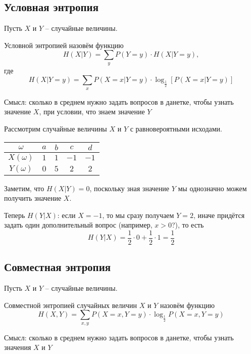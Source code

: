 \documentclass{article}
\begin{document}
\subsection{Условная энтропия}

Пусть $X$ и $Y$ -- случайные величины.

\begin{definition}
    Условной энтропией назовём функцию
    \[
        H(X|Y) = \sum_y P(Y = y) \cdot H(X|Y = y),  
    \]
    где
    \[
        H(X|Y = y) = \sum_x P(X = x | Y = y) \cdot \log_{\frac 12} \left[ P(X = x|Y = y) \right]
    \]

    \footnotesize{
        Смысл: сколько в среднем нужно задать вопросов в данетке, чтобы узнать значение $X$, при условии, что знаем значение $Y$
    }
\end{definition}

\begin{example}
    Рассмотрим случайные величины $X$ и $Y$ с равновероятными исходами.

    \begin{center}
        \begin{tabular}{|c|c|c|c|c|}
            \hline
            $\omega$    & $a$ & $b$ & $c$  & $d$  \\ \hline
            $X(\omega)$ & $1$ & $1$ & $-1$ & $-1$ \\ \hline
            $Y(\omega)$ & $0$ & $5$ & $2$  & $2$  \\ \hline
        \end{tabular}
    \end{center}

    Заметим, что $H(X|Y) = 0$, поскольку зная значение $Y$ мы однозначно можем получить значение $X$.

    Теперь $H(Y|X)$: если $X = -1$, то мы сразу получаем $Y = 2$, иначе придётся задать один дополнительный вопрос (например, $x > 0$?), то есть
    \[
        H(Y|X) = \frac 12 \cdot 0 + \frac 12 \cdot 1 = \frac12
    \]

\end{example}

\subsection{Совместная энтропия}

Пусть $X$ и $Y$ -- случайные величины.

\begin{definition}
    Совместной энтропией случайных величин $X$ и $Y$ назовём функцию
    \[
        H(X, Y) = \sum_{x, y} P(X = x, Y = y) \cdot \log_{\frac12} P(X = x, Y = y)
    \]

    \footnotesize{
        Смысл: сколько в среднем нужно задать вопросов в данетке, чтобы узнать значения $X$ и $Y$
    }
\end{definition}
\end{document}
